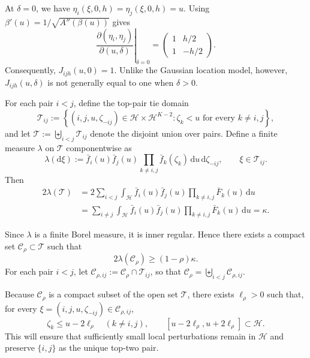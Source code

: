 \documentclass[10pt]{article}
\newcommand{\dd}{\mathrm{d}}
\theoremstyle{plain}
\begin{document}
At $\delta=0$, we have
$\eta_i(\xi,0,h)=\eta_j(\xi,0,h)=u$. Using
$\beta'(u)=1/\sqrt{A''(\beta(u))}$ gives
\[
    \left.
    \frac{\partial(\eta_i,\eta_j)}
         {\partial(u,\delta)}
    \right|_{\delta=0}
    =
    \begin{pmatrix}
        1 & h/2\\
        1 & -h/2
    \end{pmatrix}.
\]
Consequently, $J_{ijh}(u,0)=1$. Unlike the Gaussian location model,
however, $J_{ijh}(u,\delta)$ is not generally equal to one when
$\delta>0$.

For each pair $i<j$, define the top-pair tie domain
\[
    \mathcal T_{ij}
    :=
    \left\{
        (i,j,u,\zeta_{-ij})
        \in\mathcal H\times\mathcal H^{K-2}:
        \zeta_k<u
        \text{ for every }k\neq i,j
    \right\},
\]
and let $\mathcal T:=\biguplus_{i<j}\mathcal T_{ij}$ denote the disjoint
union over pairs. Define a finite measure $\lambda$ on $\mathcal T$
componentwise as
\[
    \lambda(\dd\xi)
    :=
    \bar f_i(u)\bar f_j(u)
    \prod_{k\neq i,j}\bar f_k(\zeta_k)
    \,\dd u\,\dd\zeta_{-ij},
    \qquad
    \xi\in\mathcal T_{ij}.
\]
Then
\[
\begin{aligned}
    2\lambda(\mathcal T)
    &=
    2\sum_{i<j}
    \int_{\mathcal H}
        \bar f_i(u)\bar f_j(u)
        \prod_{k\neq i,j}\bar F_k(u)
    \,\dd u\\
    &=
    \sum_{i\neq j}
    \int_{\mathcal H}
        \bar f_i(u)\bar f_j(u)
        \prod_{k\neq i,j}\bar F_k(u)
    \,\dd u
    =
    \kappa.
\end{aligned}
\]

Since $\lambda$ is a finite Borel measure, it is inner regular. Hence there
exists a compact set $\mathcal C_\rho\subset\mathcal T$ such that
\begin{equation}
\label{eq:Xi-rho-mass-transfer-lower}
    2\lambda(\mathcal C_\rho)
    \ge
    (1-\rho)\kappa.
\end{equation}
For each pair $i<j$, let
    $\mathcal C_{\rho,ij}
    :=
    \mathcal C_\rho\cap\mathcal T_{ij}$,
so that
$\mathcal C_\rho=\biguplus_{i<j}\mathcal C_{\rho,ij}$.

Because $\mathcal C_\rho$ is a compact subset of the open set
$\mathcal T$, there exists $\ell_\rho>0$ such that, for every
$\xi=(i,j,u,\zeta_{-ij})\in\mathcal C_{\rho,ij}$,
\begin{equation}
\label{eq:compact-context-margin}
    \zeta_k
    \le
    u-2\ell_\rho
    \quad(k\neq i,j),
    \qquad
    [u-2\ell_\rho,u+2\ell_\rho]
    \subset\mathcal H.
\end{equation}
This will ensure that sufficiently small local perturbations remain in
$\mathcal H$ and preserve $\{i,j\}$ as the unique top-two pair.
\end{document}
